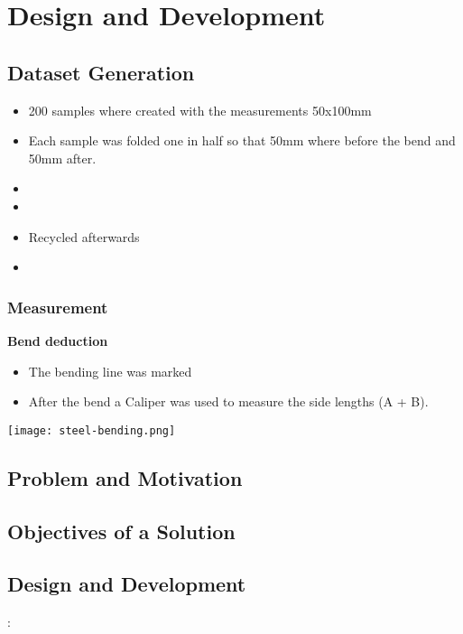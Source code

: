 \section{Design and Development}
\subsection{Dataset Generation}
\begin{itemize}
    \item 200 samples where created with the measurements 50x100mm
    \item Each sample was folded one in half so that 50mm where before the bend and 50mm after.
    \item 
    \item 
    \item Recycled afterwards
    \item 
\end{itemize}
\subsubsection{Measurement}

\textbf{Bend deduction} 
\begin{itemize}
    \item The bending line was marked 
    \item After the bend a Caliper was used to measure the side lengths (A + B).
\end{itemize}

\texttt{[image: steel-bending.png]}

\subsection{Problem and Motivation}
\subsection{Objectives of a Solution}
\subsection{Design and Development}:
